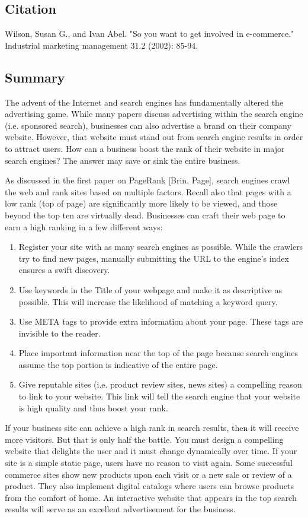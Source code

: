 \documentclass[../summaries.tex]{subfiles}
\begin{document}
\subsection{Citation}
Wilson, Susan G., and Ivan Abel. "So you want to get involved in e-commerce." Industrial marketing management 31.2 (2002): 85-94.

\subsection{Summary}
The advent of the Internet and search engines has fundamentally altered the advertising game. While many papers discuss advertising within the search engine (i.e. sponsored search), businesses can also advertise a brand on their company website. However, that website must stand out from search engine results in order to attract users. How can a business boost the rank of their website in major search engines? The answer may save or sink the entire business.

As discussed in the first paper on PageRank [Brin, Page], search engines crawl the web and rank sites based on multiple factors. Recall also that pages with a low rank (top of page) are significantly more likely to be viewed, and those beyond the top ten are virtually dead. Businesses can craft their web page to earn a high ranking in a few different ways:

\begin{enumerate}
\item Register your site with as many search engines as possible. While the crawlers try to find new pages, manually submitting the URL to the engine's index ensures a swift discovery.
\item Use keywords in the Title of your webpage and make it as descriptive as possible. This will increase the likelihood of matching a keyword query.
\item Use META tags to provide extra information about your page. These tags are invisible to the reader.
\item Place important information near the top of the page because search engines assume the top portion is indicative of the entire page.
\item Give reputable sites (i.e. product review sites, news sites) a compelling reason to link to your website. This link will tell the search engine that your website is high quality and thus boost your rank.
\end{enumerate}

If your business site can achieve a high rank in search results, then it will receive more visitors. But that is only half the battle. You must design a compelling website that delights the user and it must change dynamically over time. If your site is a simple static page, users have no reason to visit again. Some successful commerce sites show new products upon each visit or a new sale or review of a product. They also implement digital catalogs where users can browse products from the comfort of home. An interactive website that appears in the top search results will serve as an excellent advertisement for the business.
\end{document}
